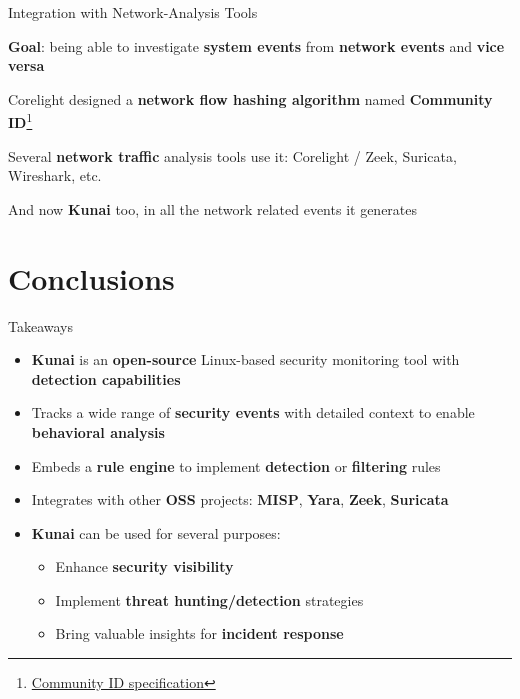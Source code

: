 \documentclass[10pt,aspectratio=169, colorlinks=true, linkcolor=circlBlue]{beamer}
\begin{document}
\begin{frame}{Integration with Network-Analysis Tools}

	\textbf{Goal}: being able to investigate \textbf{system events} from \textbf{network events} and \textbf{vice versa}

	Corelight designed a \textbf{network flow hashing algorithm} named \textbf{Community ID}\footnote{\href{https://github.com/corelight/community-id-spec}{Community ID specification}}

	Several \textbf{network traffic} analysis tools use it: Corelight / Zeek, Suricata, Wireshark, etc.

	And now \textbf{Kunai} too, in all the network related events it generates

\end{frame}

\section{Conclusions}

\begin{frame}{Takeaways}
	\begin{itemize}
		\item \textbf{Kunai} is an \textbf{open-source} Linux-based security monitoring tool with \textbf{detection capabilities}
		\item Tracks a wide range of \textbf{security events} with detailed context to enable \textbf{behavioral analysis}
		\item Embeds a \textbf{rule engine} to implement \textbf{detection} or \textbf{filtering} rules
		\item Integrates with other \textbf{OSS} projects: \textbf{MISP}, \textbf{Yara}, \textbf{Zeek}, \textbf{Suricata}
		\item \textbf{Kunai} can be used for several purposes:
		      \begin{itemize}
			      \item Enhance \textbf{security visibility}
			      \item Implement \textbf{threat hunting/detection} strategies
			      \item Bring valuable insights for \textbf{incident response}
		      \end{itemize}
	\end{itemize}
\end{frame}
\end{document}
